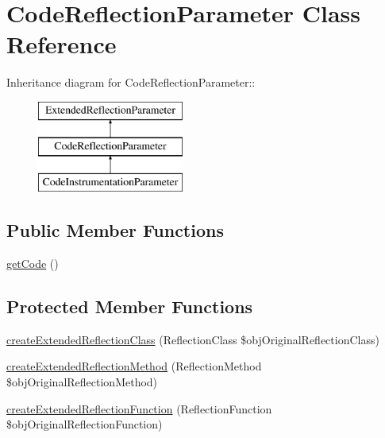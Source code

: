 \hypertarget{class_code_reflection_parameter}{
\section{CodeReflectionParameter Class Reference}
\label{class_code_reflection_parameter}
}
Inheritance diagram for CodeReflectionParameter::\begin{figure}[H]
\begin{center}
\leavevmode
\includegraphics[height=3cm]{class_code_reflection_parameter}
\end{center}
\end{figure}
\subsection*{Public Member Functions}
\begin{CompactItemize}
\item 
\hyperlink{class_code_reflection_parameter_16918720d7f6522b9a9baa9cfbb4cfc7}{getCode} ()
\end{CompactItemize}
\subsection*{Protected Member Functions}
\begin{CompactItemize}
\item 
\hyperlink{class_code_reflection_parameter_a2b9b21f9711afbf11791dd64dcbdd0a}{createExtendedReflectionClass} (ReflectionClass \$objOriginalReflectionClass)
\item 
\hyperlink{class_code_reflection_parameter_04d7dbd71bc943f3e267869a79bec648}{createExtendedReflectionMethod} (ReflectionMethod \$objOriginalReflectionMethod)
\item 
\hyperlink{class_code_reflection_parameter_5e6e7a1f49ff1f404342a2b2d4a15aa3}{createExtendedReflectionFunction} (ReflectionFunction \$objOriginalReflectionFunction)
\end{CompactItemize}


